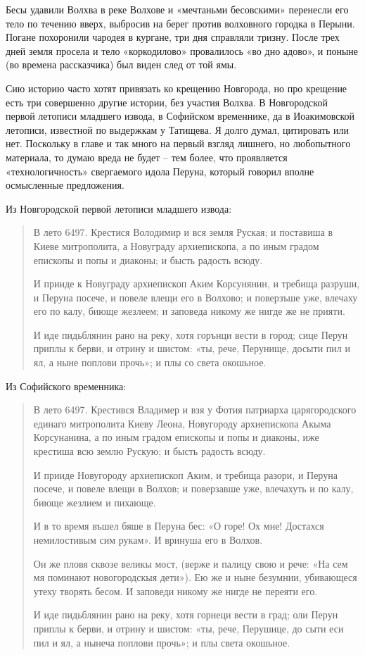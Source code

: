 Бесы удавили Волхва в реке Волхове и «мечтаньми бесовскими» перенесли его тело по течению вверх, выбросив на берег против волховного городка в Перыни. Погане похоронили чародея в кургане, три дня справляли тризну. После трех дней земля просела и тело «коркодилово» провалилось «во дно адово», и поныне (во времена рассказчика) был виден след от той ямы.

Сию историю часто хотят привязать ко крещению Новгорода, но про крещение есть три совершенно другие истории, без участия Волхва. В Новгородской первой летописи младшего извода, в Софийском временнике, да в Иоакимовской летописи, известной по выдержкам у Татищева. Я долго думал, цитировать или нет. Поскольку в главе и так много на первый взгляд лишнего, но любопытного материала, то думаю вреда не будет – тем более, что проявляется «технологичность» свергаемого идола Перуна, который говорил вполне осмысленные предложения.

Из Новгородской первой летописи младшего извода:

\begin{quotation}  
В лето 6497. Крестися Володимир и вся земля Руская; и поставиша в Киеве митрополита, а Новуграду архиепископа, а по иным градом епископы и попы и диаконы; и бысть радость всюду. 

И прииде к Новуграду архиепископ Аким Корсунянин, и требища разруши, и Перуна посече, и повеле влещи его в Волхово; и поверзъше уже, влечаху его по калу, биюще жезлеем; и заповеда никому же нигде же не прияти. 

И иде пидьблянин рано на реку, хотя горънци вести в город; сице Перун приплы к берви, и отрину и шистом: «ты, рече, Перунище, досыти пил и ял, а ныне поплови прочь»; и плы со света окошьное.
\end{quotation}

Из Софийского временника:

\begin{quotation}  
В лето 6497. Крестився Владимер и взя у Фотия патриарха царягородского единаго митрополита Киеву Леона, Новугороду архиепископа Акыма Корсунанина, а по иным градом епископы и попы и диаконы, иже крестиша всю землю Рускую; и бысть радость всюду.

И прииде Новугороду архиепископ Аким, и требища разори, и Перуна посече, и повеле влещи в Волхов; и поверзавше уже, влечахуть и по калу, биюще жезлием и пихающе. 

И в то время въшел бяше в Перуна бес: «О горе! Ох мне! Достахся немилостивым сим рукам». И вринуша его в Волхов. 

Он же пловя сквозе великы мост, (верже и палицу свою и рече: «На сем мя поминают новогородскыя дети»). Ею же и ныне безумнии, убивающеся утеху творять бесом. И заповеди никому же нигде не переяти его. 

И иде пидьблянин рано на реку, хотя горнеци вести в град; оли Перун приплы к берви, и отрину и шистом: «ты, рече, Перушице, до сыти еси пил и ял, а нынеча поплови прочь»; и плы света окошьное.
\end{quotation}  

